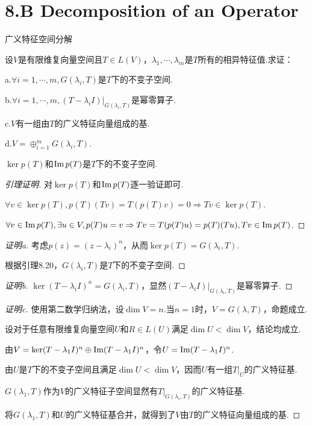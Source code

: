 \section{8.B Decomposition of an Operator}

\begin{theorem}[8.21]\label{thm 8.21} 广义特征空间分解 \:

    设\(V\)是有限维复向量空间且\(T \in L(V)\)，\(\lambda_1,\cdots,\lambda_m\)是\(T\)所有的相异特征值.求证：

    a.\(\forall i=1,\cdots,m,G(\lambda_i,T)\)是\(T\)下的不变子空间.
    
    b.\(\forall i=1,\cdots,m,(T-\lambda_i I)|_{G(\lambda_i,T)}\)是幂零算子.
    
    c.\(V\)有一组由\(T\)的广义特征向量组成的基.
    
    d.\(V=\oplus_{i=1}^m G(\lambda_i,T)\).
\end{theorem}

\begin{lemma}[8.20]\label{lem 8.20}
    \(\ker p(T)\)和\(\operatorname{Im} p(T)\)是\(T\)下的不变子空间.
\end{lemma}

\begin{proof}[引理证明]
    对\(\ker p(T)\)和\(\operatorname{Im} p(T)\)逐一验证即可.

    \(\forall v \in \ker p(T),p(T)(Tv)=T(p(T)v)=0 \Rightarrow Tv \in \ker p(T)\).
    
    \(\forall v \in \operatorname{Im} p(T),\exists u \in V,p(T)u=v \Rightarrow Tv=T(p(T)u)=p(T)(Tu),Tv \in \operatorname{Im} p(T)\).
\end{proof}

\begin{proof}[证明a]
    考虑\(p(z)=(z-\lambda_i)^n\)，从而\(\ker p(T)=G(\lambda_i,T)\).

    根据引理8.20，\(G(\lambda_i,T)\)是\(T\)下的不变子空间.
\end{proof}

\begin{proof}[证明b]
    \(\ker (T-\lambda_i I)^n=G(\lambda_i,T)\)，显然\((T-\lambda_i I)|_{G(\lambda_i,T)}\)是幂零算子.
\end{proof}

\begin{proof}[证明c]
    使用第二数学归纳法，设\(\dim V=n\).当\(n=1\)时，\(V=G(\lambda,T)\)，命题成立.

    设对于任意有限维复向量空间\(U\)和\(R \in L(U)\)满足\(\dim U<\dim V\)，结论均成立.
    
    由\(V=\ker (T-\lambda_1 I)^n \oplus \operatorname{Im} (T-\lambda_1 I)^n\)，令\(U=\operatorname{Im} (T-\lambda_1 I)^n\).
    
    由\(U\)是\(T\)下的不变子空间且满足\(\dim U<\dim V\)，因而\(U\)有一组\(T|_U\)的广义特征基.
    
    \(G(\lambda_1,T)\)作为\(V\)的广义特征子空间显然有\(T|_{G(\lambda_i,T)}\)的广义特征基.
    
    将\(G(\lambda_1,T)\)和\(U\)的广义特征基合并，就得到了\(V\)由\(T\)的广义特征向量组成的基.
\end{proof}

